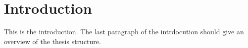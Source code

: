 \section{Introduction}

This is the introduction. The last paragraph of the intrdocution should give an overview of the thesis structure.